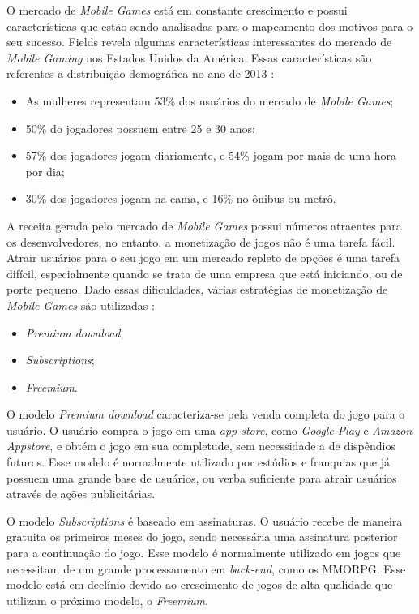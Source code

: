 O mercado de \textit{Mobile Games} está em constante crescimento e possui características que estão sendo analisadas para o mapeamento dos motivos para o seu sucesso. Fields \cite{fields2014} revela algumas características interessantes do mercado de \textit{Mobile Gaming} nos Estados Unidos da América. Essas características são referentes a distribuição demográfica no ano de 2013 \cite{fields2014}:

\begin{itemize}
  \item As mulheres representam 53\% dos usuários do mercado de \textit{Mobile Games};
  \item 50\% do jogadores possuem entre 25 e 30 anos;
  \item 57\% dos jogadores jogam diariamente, e 54\% jogam por mais de uma hora por dia;
  \item 30\% dos jogadores jogam na cama, e 16\% no ônibus ou metrô.
\end{itemize}

A receita gerada pelo mercado de \textit{Mobile Games} possui números atraentes para os desenvolvedores, no entanto, a monetização de jogos não é uma tarefa fácil. Atrair usuários para o seu jogo em um mercado repleto de opções é uma tarefa difícil, especialmente quando se trata de uma empresa que está iniciando, ou de porte pequeno. Dado essas dificuldades, várias estratégias de monetização de \textit{Mobile Games} são utilizadas \cite{fields2014}:

\begin{itemize}
  \item \textit{Premium download};
  \item \textit{Subscriptions};
  \item \textit{Freemium}.
\end{itemize}

O modelo \textit{Premium download} caracteriza-se pela venda completa do jogo para o usuário. O usuário compra o jogo em uma \textit{app store}, como \textit{Google Play} e \textit{Amazon Appstore}, e obtém o jogo em sua completude, sem necessidade a de dispêndios futuros. Esse modelo é normalmente utilizado por estúdios e franquias que já possuem uma grande base de usuários, ou verba suficiente para atrair usuários através de ações publicitárias.

O modelo \textit{Subscriptions} é baseado em assinaturas. O usuário recebe de maneira gratuita os primeiros meses do jogo, sendo necessária uma assinatura posterior para a continuação do jogo. Esse modelo é normalmente utilizado em jogos que necessitam de um grande processamento em \textit{back-end}, como os MMORPG. Esse modelo está em declínio devido ao crescimento de jogos de alta qualidade que utilizam o próximo modelo, o \textit{Freemium}.

